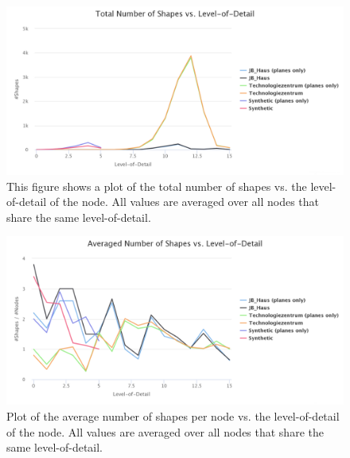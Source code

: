 \begin{figure}[h]
    \centering
    \includegraphics[width=1\textwidth]{Results/shapes_total_vs_lod.png}
    \caption[Plot of the total number of shapes vs. to the level-of-detail of the node]
		{This figure shows a plot of the total number of shapes vs. the level-of-detail of the node. All values are averaged over all nodes that share the same level-of-detail.}
    \label{fig:shapes_total_vs_lod}
\end{figure}

\begin{figure}[h]
    \centering
    \includegraphics[width=1\textwidth]{Results/shapes_averaged_vs_lod.png}
    \caption[Plot of the average number of shapes per node vs. the level-of-detail of the node]
		{Plot of the average number of shapes per node vs. the level-of-detail of the node. All values are averaged over all nodes that share the same level-of-detail.}
    \label{fig:shapes_averaged_vs_lod}
\end{figure}

